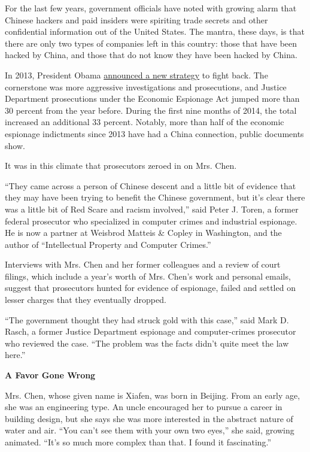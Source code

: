 For the last few years, government officials have noted with growing
alarm that Chinese hackers and paid insiders were spiriting trade
secrets and other confidential information out of the United States. The
mantra, these days, is that there are only two types of companies left
in this country: those that have been hacked by China, and those that do
not know they have been hacked by China.

In 2013, President Obama
\href{http://www.nytimes.com/2013/02/25/world/asia/us-confronts-cyber-cold-war-with-china.html}{announced
a new strategy} to fight back. The cornerstone was more aggressive
investigations and prosecutions, and Justice Department prosecutions
under the Economic Espionage Act jumped more than 30 percent from the
year before. During the first nine months of 2014, the total increased
an additional 33 percent. Notably, more than half of the economic
espionage indictments since 2013 have had a China connection, public
documents show.

It was in this climate that prosecutors zeroed in on Mrs. Chen.

``They came across a person of Chinese descent and a little bit of
evidence that they may have been trying to benefit the Chinese
government, but it's clear there was a little bit of Red Scare and
racism involved,'' said Peter J. Toren, a former federal prosecutor who
specialized in computer crimes and industrial espionage. He is now a
partner at Weisbrod Matteis \& Copley in Washington, and the author of
``Intellectual Property and Computer Crimes.''

Interviews with Mrs. Chen and her former colleagues and a review of
court filings, which include a year's worth of Mrs. Chen's work and
personal emails, suggest that prosecutors hunted for evidence of
espionage, failed and settled on lesser charges that they eventually
dropped.

``The government thought they had struck gold with this case,'' said
Mark D. Rasch, a former Justice Department espionage and computer-crimes
prosecutor who reviewed the case. ``The problem was the facts didn't
quite meet the law here.''

\textbf{A Favor Gone Wrong}

Mrs. Chen, whose given name is Xiafen, was born in Beijing. From an
early age, she was an engineering type. An uncle encouraged her to
pursue a career in building design, but she says she was more interested
in the abstract nature of water and air. ``You can't see them with your
own two eyes,'' she said, growing animated. ``It's so much more complex
than that. I found it fascinating.''

